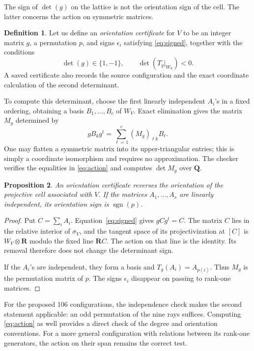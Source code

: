 \documentclass[11pt,a4paper]{article}
\numberwithin{equation}{section}
\newtheorem{proposition}{Proposition}[section]
\theoremstyle{definition}
\newtheorem{definition}[proposition]{Definition}
\theoremstyle{remark}
\newcommand{\Q}{\mathbf Q}
\newcommand{\R}{\mathbf R}
\newcommand{\sgn}{\operatorname{sgn}}
\begin{document}
The sign of \(\det(g)\) on the lattice is not the orientation sign
of the cell. The latter concerns the action on symmetric matrices.

\begin{definition}\label{def:certificate}
Let us define an \emph{orientation certificate} for \(V\) to be an
integer matrix \(g\), a permutation \(p\), and signs \(\epsilon_i\)
satisfying \eqref{eq:signed}, together with the conditions
\[
 \det(g)\in\{1,-1\},
 \qquad
 \det\!\left(T_g|_{W_V}\right)<0.
\]
A saved certificate also records the source configuration and the
exact coordinate calculation of the second determinant.
\end{definition}

To compute this determinant, choose the first linearly independent
\(A_i\)'s in a fixed ordering, obtaining a basis
\(B_1,\ldots,B_c\) of \(W_V\). Exact elimination gives the matrix
\(M_g\) determined by
\begin{equation}\label{eq:action}
 gB_k g^t=\sum_{\ell=1}^{c}(M_g)_{\ell k}B_\ell.
\end{equation}
One may flatten a symmetric matrix into its upper-triangular entries;
this is simply a coordinate isomorphism and requires no approximation.
The checker verifies the equalities in \eqref{eq:action} and computes
\(\det M_g\) over \(\Q\).

\begin{proposition}\label{prop:orientation}
An orientation certificate reverses the orientation of the projective
cell associated with \(V\). If the matrices \(A_1,\ldots,A_s\) are
linearly independent, its orientation sign is \(\sgn(p)\).
\end{proposition}

\begin{proof}
Put \(C=\sum_i A_i\). Equation~\eqref{eq:signed} gives
\(gCg^t=C\). The matrix \(C\) lies in the relative interior of
\(\sigma_V\), and the tangent space of its projectivization at
\([C]\) is \(W_V\otimes\R\) modulo the fixed line \(\R C\).
The action on that line is the identity. Its removal therefore does
not change the determinant sign.

If the \(A_i\)'s are independent, they form a basis and
\(T_g(A_i)=A_{p(i)}\). Thus \(M_g\) is the permutation matrix of \(p\).
The signs \(\epsilon_i\) disappear on passing to rank-one matrices.
\end{proof}

For the proposed 106 configurations, the independence check makes the
second statement applicable: an odd permutation of the nine rays
suffices. Computing \eqref{eq:action} as well provides a direct check
of the degree and orientation conventions. For a more general
configuration with relations between its rank-one generators, the
action on their span remains the correct test.
\end{document}
